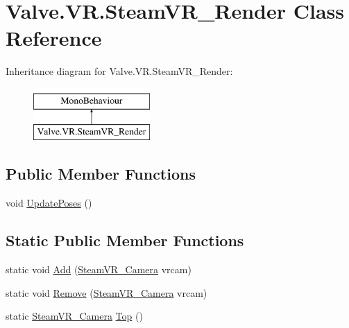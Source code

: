 \hypertarget{class_valve_1_1_v_r_1_1_steam_v_r___render}{}\section{Valve.\+V\+R.\+Steam\+V\+R\+\_\+\+Render Class Reference}
\label{class_valve_1_1_v_r_1_1_steam_v_r___render}
Inheritance diagram for Valve.\+V\+R.\+Steam\+V\+R\+\_\+\+Render\+:\begin{figure}[H]
\begin{center}
\leavevmode
\includegraphics[height=2.000000cm]{class_valve_1_1_v_r_1_1_steam_v_r___render}
\end{center}
\end{figure}
\subsection*{Public Member Functions}
\begin{DoxyCompactItemize}
\item 
void \mbox{\hyperlink{class_valve_1_1_v_r_1_1_steam_v_r___render_a1900b379063ebffa468304110fe4d0fe}{Update\+Poses}} ()
\end{DoxyCompactItemize}
\subsection*{Static Public Member Functions}
\begin{DoxyCompactItemize}
\item 
static void \mbox{\hyperlink{class_valve_1_1_v_r_1_1_steam_v_r___render_a7ea09b18f7b096dca11e1ca1d66ea869}{Add}} (\mbox{\hyperlink{class_valve_1_1_v_r_1_1_steam_v_r___camera}{Steam\+V\+R\+\_\+\+Camera}} vrcam)
\item 
static void \mbox{\hyperlink{class_valve_1_1_v_r_1_1_steam_v_r___render_a3c9d43d12a9793294f79f5022223e0f5}{Remove}} (\mbox{\hyperlink{class_valve_1_1_v_r_1_1_steam_v_r___camera}{Steam\+V\+R\+\_\+\+Camera}} vrcam)
\item 
static \mbox{\hyperlink{class_valve_1_1_v_r_1_1_steam_v_r___camera}{Steam\+V\+R\+\_\+\+Camera}} \mbox{\hyperlink{class_valve_1_1_v_r_1_1_steam_v_r___render_a4fae36331a03674fa212cfc38aa18358}{Top}} ()
\end{DoxyCompactItemize}
